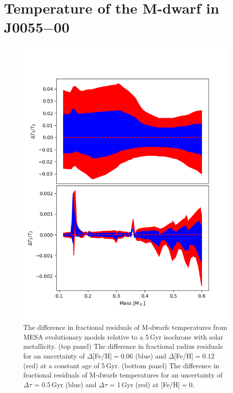 %
%
\section{Temperature of the M-dwarf in J0055$-$00}\label{discuss:J0055-00T2}

\begin{figure}
    \centering
    \includegraphics[scale=0.8]{9-Discussion/images/T2_sensitivity.png}
    \caption{The difference in fractional residuals of M-dwarfs temperatures from MESA evolutionary models relative to a 5\,Gyr isochrone with solar metallicity. (top panel) The difference in fractional radius residuals for an uncertainty of $\Delta$[Fe/H]$ = 0.06$ (blue) and $\Delta$[Fe/H]$ = 0.12$ (red) at a constant age of 5\,Gyr. (bottom panel) The difference in fractional residuals of M-dwarfs temperatures for an uncertainty of $\Delta \tau$ = 0.5\,Gyr (blue) and $\Delta \tau$ = 1\,Gyr (red) at [Fe/H]$ = 0$.}
    \label{fig:T2_diff}
\end{figure}

